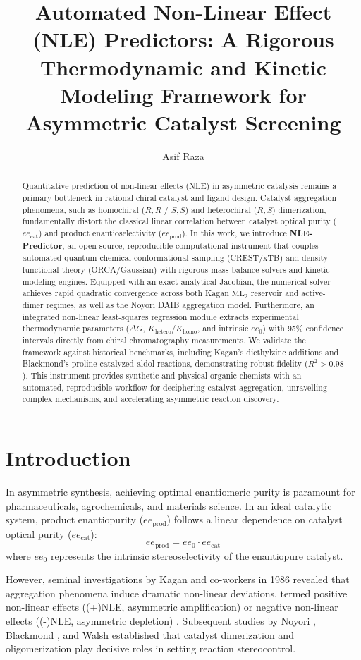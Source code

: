 \documentclass[journal=jacsat,manuscript=article]{achemso}
\author{Asif Raza}
\affiliation{Department of Chemistry, Jamia Hamdard}
\title{Automated Non-Linear Effect (NLE) Predictors: A Rigorous Thermodynamic and Kinetic Modeling Framework for Asymmetric Catalyst Screening}
\begin{document}
\begin{abstract}
Quantitative prediction of non-linear effects (NLE) in asymmetric catalysis remains a primary bottleneck in rational chiral catalyst and ligand design. Catalyst aggregation phenomena, such as homochiral ($R,R$ / $S,S$) and heterochiral ($R,S$) dimerization, fundamentally distort the classical linear correlation between catalyst optical purity ($ee_{\text{cat}}$) and product enantioselectivity ($ee_{\text{prod}}$). In this work, we introduce \textbf{NLE-Predictor}, an open-source, reproducible computational instrument that couples automated quantum chemical conformational sampling (CREST/xTB) and density functional theory (ORCA/Gaussian) with rigorous mass-balance solvers and kinetic modeling engines. Equipped with an exact analytical Jacobian, the numerical solver achieves rapid quadratic convergence across both Kagan $\text{ML}_2$ reservoir and active-dimer regimes, as well as the Noyori DAIB aggregation model. Furthermore, an integrated non-linear least-squares regression module extracts experimental thermodynamic parameters ($\Delta G$, $K_{\text{hetero}}/K_{\text{homo}}$, and intrinsic $ee_0$) with 95\% confidence intervals directly from chiral chromatography measurements. We validate the framework against historical benchmarks, including Kagan's diethylzinc additions and Blackmond's proline-catalyzed aldol reactions, demonstrating robust fidelity ($R^2 > 0.98$). This instrument provides synthetic and physical organic chemists with an automated, reproducible workflow for deciphering catalyst aggregation, unravelling complex mechanisms, and accelerating asymmetric reaction discovery.
\end{abstract}

\section{Introduction}
In asymmetric synthesis, achieving optimal enantiomeric purity is paramount for pharmaceuticals, agrochemicals, and materials science. In an ideal catalytic system, product enantiopurity ($ee_{\text{prod}}$) follows a linear dependence on catalyst optical purity ($ee_{\text{cat}}$):
\begin{equation}
ee_{\text{prod}} = ee_0 \cdot ee_{\text{cat}}
\end{equation}
where $ee_0$ represents the intrinsic stereoselectivity of the enantiopure catalyst.

However, seminal investigations by Kagan and co-workers in 1986 revealed that aggregation phenomena induce dramatic non-linear deviations, termed positive non-linear effects ((+)NLE, asymmetric amplification) or negative non-linear effects ((-)NLE, asymmetric depletion) \cite{Kagan1986,Kagan1989,Kagan2003}. Subsequent studies by Noyori \cite{Noyori1989}, Blackmond \cite{Blackmond2000,Blackmond2004}, and Walsh \cite{Walsh2003} established that catalyst dimerization and oligomerization play decisive roles in setting reaction stereocontrol.
\end{document}
